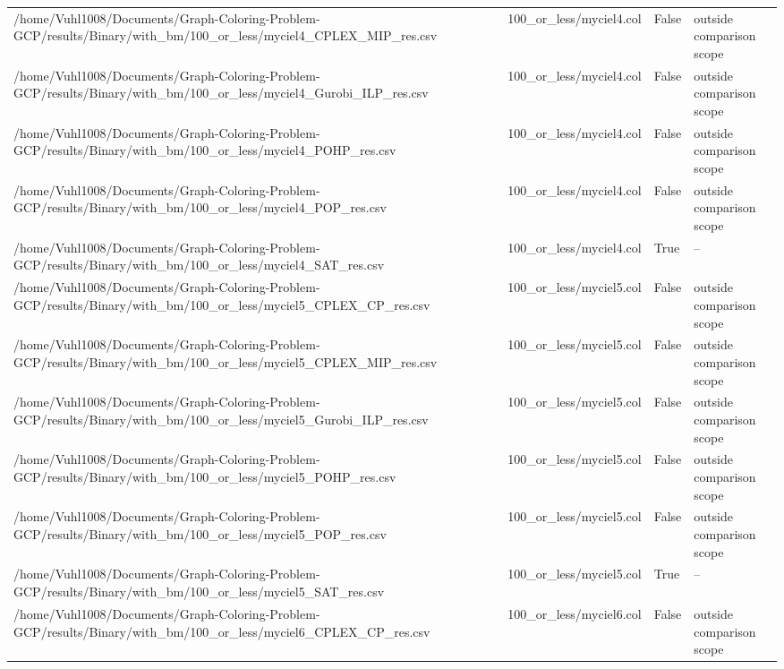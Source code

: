 \begin{table}[htbp]
\begin{tabular}{llll}
/home/Vuhl1008/Documents/Graph-Coloring-Problem-GCP/results/Binary/with\_bm/100\_or\_less/myciel4\_CPLEX\_MIP\_res.csv & 100\_or\_less/myciel4.col & False & outside comparison scope \\
/home/Vuhl1008/Documents/Graph-Coloring-Problem-GCP/results/Binary/with\_bm/100\_or\_less/myciel4\_Gurobi\_ILP\_res.csv & 100\_or\_less/myciel4.col & False & outside comparison scope \\
/home/Vuhl1008/Documents/Graph-Coloring-Problem-GCP/results/Binary/with\_bm/100\_or\_less/myciel4\_POHP\_res.csv & 100\_or\_less/myciel4.col & False & outside comparison scope \\
/home/Vuhl1008/Documents/Graph-Coloring-Problem-GCP/results/Binary/with\_bm/100\_or\_less/myciel4\_POP\_res.csv & 100\_or\_less/myciel4.col & False & outside comparison scope \\
/home/Vuhl1008/Documents/Graph-Coloring-Problem-GCP/results/Binary/with\_bm/100\_or\_less/myciel4\_SAT\_res.csv & 100\_or\_less/myciel4.col & True & -- \\
/home/Vuhl1008/Documents/Graph-Coloring-Problem-GCP/results/Binary/with\_bm/100\_or\_less/myciel5\_CPLEX\_CP\_res.csv & 100\_or\_less/myciel5.col & False & outside comparison scope \\
/home/Vuhl1008/Documents/Graph-Coloring-Problem-GCP/results/Binary/with\_bm/100\_or\_less/myciel5\_CPLEX\_MIP\_res.csv & 100\_or\_less/myciel5.col & False & outside comparison scope \\
/home/Vuhl1008/Documents/Graph-Coloring-Problem-GCP/results/Binary/with\_bm/100\_or\_less/myciel5\_Gurobi\_ILP\_res.csv & 100\_or\_less/myciel5.col & False & outside comparison scope \\
/home/Vuhl1008/Documents/Graph-Coloring-Problem-GCP/results/Binary/with\_bm/100\_or\_less/myciel5\_POHP\_res.csv & 100\_or\_less/myciel5.col & False & outside comparison scope \\
/home/Vuhl1008/Documents/Graph-Coloring-Problem-GCP/results/Binary/with\_bm/100\_or\_less/myciel5\_POP\_res.csv & 100\_or\_less/myciel5.col & False & outside comparison scope \\
/home/Vuhl1008/Documents/Graph-Coloring-Problem-GCP/results/Binary/with\_bm/100\_or\_less/myciel5\_SAT\_res.csv & 100\_or\_less/myciel5.col & True & -- \\
/home/Vuhl1008/Documents/Graph-Coloring-Problem-GCP/results/Binary/with\_bm/100\_or\_less/myciel6\_CPLEX\_CP\_res.csv & 100\_or\_less/myciel6.col & False & outside comparison scope \\

\end{tabular}
\end{table}
